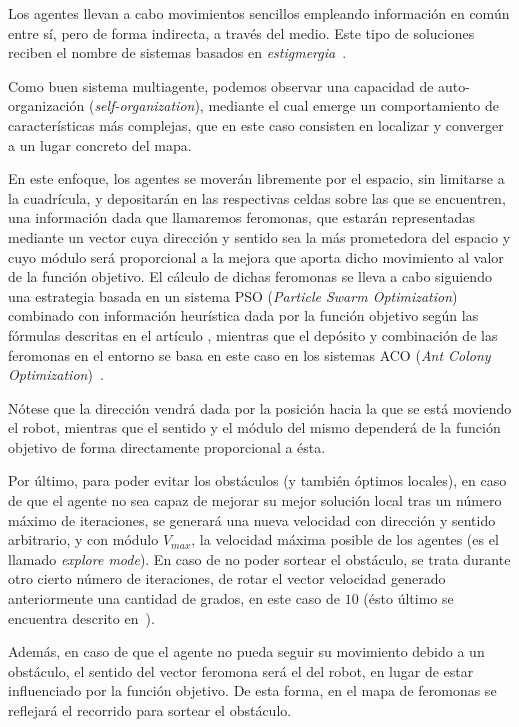     Los agentes llevan a cabo movimientos sencillos empleando información en común entre sí, pero de forma indirecta, a través del medio. Este tipo de soluciones reciben el nombre de sistemas basados en \textit{estigmergia}~\cite{stigmergy}.

    Como buen sistema multiagente, podemos observar una capacidad de auto-organización (\textit{self-organization}), mediante el cual emerge un comportamiento de características más complejas, que en este caso consisten en localizar y converger a un lugar concreto del mapa.

    En este enfoque, los agentes se moverán libremente por el espacio, sin limitarse a la cuadrícula, y depositarán en las respectivas celdas sobre las que se encuentren, una información dada que llamaremos feromonas, que estarán representadas mediante un vector cuya dirección y sentido sea la más prometedora del espacio y cuyo módulo será proporcional a la mejora que aporta dicho movimiento al valor de la función objetivo. El cálculo de dichas feromonas se lleva a cabo siguiendo una estrategia basada en un sistema PSO (\textit{Particle Swarm Optimization})~\cite{PSO} combinado con información heurística dada por la función objetivo según las fórmulas descritas en el artículo \cite{initialPaper}, mientras que el depósito y combinación de las feromonas en el entorno se basa en este caso en los sistemas ACO (\textit{Ant Colony Optimization})~\cite{ACO}.

    Nótese que la dirección vendrá dada por la posición hacia la que se está moviendo el robot, mientras que el sentido y el módulo del mismo dependerá de la función objetivo de forma directamente proporcional a ésta.

    Por último, para poder evitar los obstáculos (y también óptimos locales), en caso de que el agente no sea capaz de mejorar su mejor solución local tras un número máximo de iteraciones, se generará una nueva velocidad con dirección y sentido arbitrario, y con módulo $V_{max}$, la velocidad máxima posible de los agentes (es el llamado \textit{explore mode}). En caso de no poder sortear el obstáculo, se trata durante otro cierto número de iteraciones, de rotar el vector velocidad generado anteriormente una cantidad de grados, en este caso de $10$ (ésto último se encuentra descrito en~\cite{referencedPaper}). 
    
    Además, en caso de que el agente no pueda seguir su movimiento debido a un obstáculo, el sentido del vector feromona será el del robot, en lugar de estar influenciado por la función objetivo. De esta forma, en el mapa de feromonas se reflejará el recorrido para sortear el obstáculo.
    